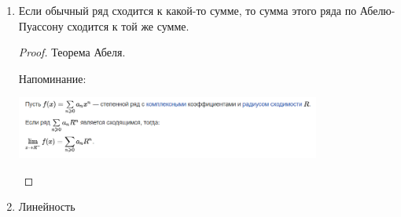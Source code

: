 \begin{properties}
    \begin{enumerate}
        \item {

            Если обычный ряд сходится к какой-то сумме, то сумма этого ряда по Абелю-Пуассону сходится к той же сумме. 

            \begin{proof}
                Теорема Абеля.

                Напоминание:

                \begin{center}
                    \includegraphics[width=10cm]{assets/05-fourierreihe/abele-theorem-note.png}
                \end{center}
            \end{proof}
        }
        \item {
            Линейность
        }
    \end{enumerate}
\end{properties}

